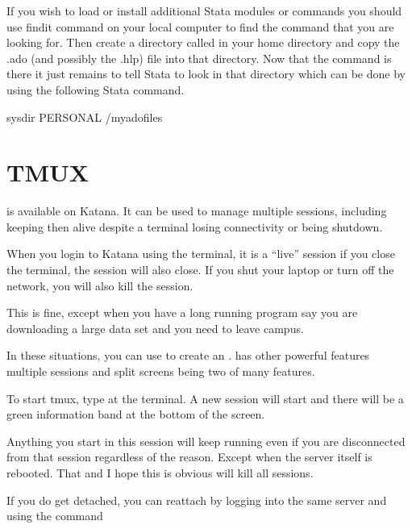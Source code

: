 \documentclass[letterpaper,10pt,english]{sphinxmanual}
\begin{document}
If you wish to load or install additional Stata modules or commands you should use findit command on your local computer to find the command that you are looking for. Then create a directory called  in your home directory and copy the .ado (and possibly the .hlp) file into that directory. Now that the command is there it just remains to tell Stata to look in that directory which can be done by using the following Stata command.

\begin{sphinxVerbatim}[commandchars=\\\{\}]
sysdir  PERSONAL /myadofiles
\end{sphinxVerbatim}


\section{TMUX}
\label{\detokenize{software/tmux:tmux}}\label{\detokenize{software/tmux::doc}}
 is available on Katana. It can be used to manage multiple sessions, including keeping then alive despite a terminal losing connectivity or being shutdown.

When you login to Katana using the terminal, it is a “live” session \sphinxhyphen{} if you close the terminal, the session will also close. If you shut your laptop or turn off the network, you will also kill the session.

This is fine, except when you have a long running program \sphinxhyphen{} say you are downloading a large data set \sphinxhyphen{} and you need to leave campus.

In these situations, you can use  to create an .  has other powerful features \sphinxhyphen{} multiple sessions and split screens being two of many features.

To start tmux, type  at the terminal. A new session will start and there will be a green information band at the bottom of the screen.

Anything you start in this session will keep running even if you are disconnected from that session regardless of the reason. Except when the server itself is rebooted. That \sphinxhyphen{} and I hope this is obvious \sphinxhyphen{} will kill all sessions.

If you do get detached, you can re\sphinxhyphen{}attach by logging into the same server and using the command 
\end{document}

